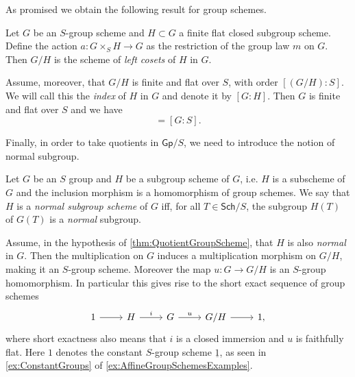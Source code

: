\noindent
As promised we obtain the following result for group schemes.
\begin{prop}\label{thm:QuotientGroupScheme}
	Let $G$ be an $S$-group scheme and $H \subset G$ a finite flat closed
	subgroup scheme.
	Define the action $a\colon G \times_{ S } H \to G$ as the restriction of the
	group law $m$ on $G$.
	Then $G/H$ is the scheme of \emph{left cosets} of $H$ in $G$.

	Assume, moreover, that $G/H$ is finite and flat over $S$,
	with order $[(G/H):S]$. We will call this the \emph{index} of $H$ in $G$
	and denote it by $[G:H]$.
	Then $G$ is finite and flat over $S$ and we have
	\begin{equation*}
		[G:H][H:S] = [G:S]
	.\end{equation*} 
\end{prop}


\noindent
Finally, in order to take quotients in \(\mathsf{Gp}/S\), we need to introduce the notion
of normal subgroup.
\begin{defn}
	Let $G$ be an $S$ group and $H$ be a subgroup scheme of $G$,
	i.e. $H$ is a subscheme of $G$ and the inclusion morphism
	is a homomorphism of group schemes.
	We say that $H$ is a \emph{normal subgroup scheme} of $G$ iff, for all 
	$T \in \mathsf{Sch}/S$, the subgroup $H(T)$ of $G(T)$ is a \emph{normal} subgroup.
\end{defn}


\begin{rem}
	Assume, in the hypothesis of \cref{thm:QuotientGroupScheme}, that $H$ is
	also \emph{normal} in $G$.
	Then the multiplication on $G$ induces a multiplication 
	morphism on $G/H$, making it an $S$-group scheme.
	Moreover the map $u\colon G \to G/H$ is
	an $S$-group homomorphism.
	In particular this gives rise to the short exact sequence of group schemes
	\begin{equation*}
	\begin{tikzcd}
		1 \arrow[r, "", rightarrow] &
		H \arrow[r, "i", rightarrow] &
		G \arrow[r, "u", rightarrow] &
		G/H \arrow[r, "", rightarrow] &
		1
	,\end{tikzcd}
	\end{equation*}
	where short exactness also means that $i$ is a closed immersion
	and $u$ is faithfully flat.
	Here $1$ denotes the constant $S$-group scheme $\underline{1}$, as
	seen in \cref{ex:ConstantGroups} of
	\cref{ex:AffineGroupSchemesExamples}.
\end{rem}



